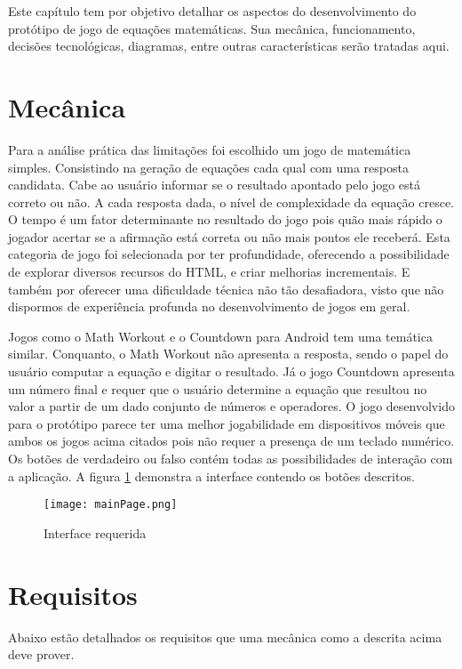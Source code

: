 Este capítulo tem por objetivo detalhar os aspectos do desenvolvimento
do protótipo de jogo de equações matemáticas. Sua mecânica, funcionamento, decisões tecnológicas,
diagramas, entre outras características serão tratadas aqui.

\section{Mecânica}

Para a análise prática das limitações foi escolhido um jogo de
matemática simples. Consistindo na geração de equações cada qual 
com uma resposta candidata. Cabe ao usuário informar se o resultado apontado
pelo jogo está correto ou não. A cada resposta dada, o nível de
complexidade da equação cresce. O tempo é um fator determinante
no resultado do jogo pois quão mais rápido o jogador acertar se a
afirmação está correta ou não mais pontos ele receberá. Esta
categoria de jogo foi selecionada por ter profundidade, oferecendo a
possibilidade de explorar diversos recursos do HTML, e criar melhorias
incrementais. E também por oferecer uma dificuldade técnica não
tão desafiadora, visto que não dispormos de experiência profunda no
desenvolvimento de jogos em geral.

Jogos como o Math Workout e o Countdown para Android tem uma temática
similar. Conquanto, o Math Workout não apresenta a resposta, sendo o
papel do usuário computar a equação e digitar o resultado. Já o jogo
Countdown apresenta um número final e requer que o usuário determine
a equação que resultou no valor a partir de um dado conjunto de
números e operadores. O jogo desenvolvido para o protótipo parece ter
uma melhor jogabilidade em dispositivos móveis que ambos os jogos acima
citados pois não requer a presença de um teclado numérico. Os botões
de verdadeiro ou falso contém todas as possibilidades de interação
com a aplicação. A figura \ref{fig:sketch} demonstra a interface
contendo os botões descritos.

\begin{figure}[H]
    \centering
    \texttt{[image: mainPage.png]}
	\caption{Interface requerida}
    \label{fig:sketch}
\end{figure}


\section{Requisitos}

Abaixo estão detalhados os requisitos que uma mecânica como a descrita
acima deve prover.


